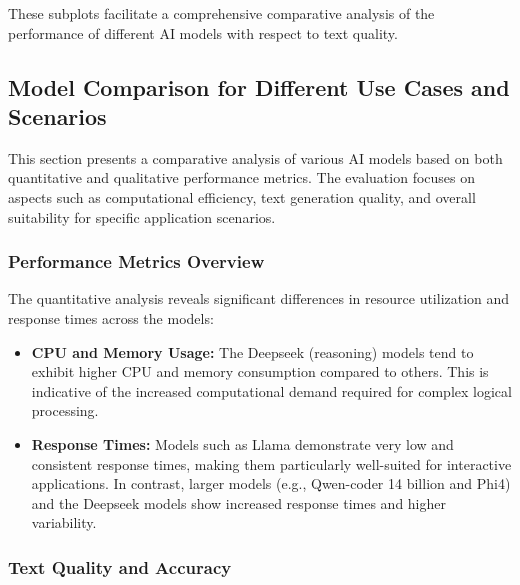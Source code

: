 These subplots facilitate a comprehensive comparative analysis of the performance of different AI models with respect to text quality.


\subsection{Model Comparison for Different Use Cases and Scenarios}

This section presents a comparative analysis of various AI models based on both quantitative and qualitative performance metrics. The evaluation focuses on aspects such as computational efficiency, text generation quality, and overall suitability for specific application scenarios.

\subsubsection{Performance Metrics Overview}

The quantitative analysis reveals significant differences in resource utilization and response times across the models:
\begin{itemize}
  \item \textbf{CPU and Memory Usage:} The Deepseek (reasoning) models tend to exhibit higher CPU and memory consumption compared to others. This is indicative of the increased computational demand required for complex logical processing.
  \item \textbf{Response Times:} Models such as Llama demonstrate very low and consistent response times, making them particularly well-suited for interactive applications. In contrast, larger models (e.g., Qwen-coder 14 billion and Phi4) and the Deepseek models show increased response times and higher variability.
\end{itemize}

\subsubsection{Text Quality and Accuracy}

